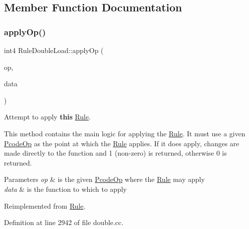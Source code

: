 \subsection{Member Function Documentation}
\mbox{\label{class_rule_double_load_afbb821bf5ea445001a47351ec57bbeb1}} 
\subsubsection{\texorpdfstring{applyOp()}{applyOp()}}
{\footnotesize\ttfamily int4 Rule\+Double\+Load\+::apply\+Op (\begin{DoxyParamCaption}\item[{\mbox{\hyperlink{class_pcode_op}{Pcode\+Op}} $\ast$}]{op,  }\item[{\mbox{\hyperlink{class_funcdata}{Funcdata}} \&}]{data }\end{DoxyParamCaption})\hspace{0.3cm}{\ttfamily [virtual]}}



Attempt to apply {\bfseries{this}} \mbox{\hyperlink{class_rule}{Rule}}. 

This method contains the main logic for applying the \mbox{\hyperlink{class_rule}{Rule}}. It must use a given \mbox{\hyperlink{class_pcode_op}{Pcode\+Op}} as the point at which the \mbox{\hyperlink{class_rule}{Rule}} applies. If it does apply, changes are made directly to the function and 1 (non-\/zero) is returned, otherwise 0 is returned. 
\begin{DoxyParams}{Parameters}
{\em op} & is the given \mbox{\hyperlink{class_pcode_op}{Pcode\+Op}} where the \mbox{\hyperlink{class_rule}{Rule}} may apply \\
\hline
{\em data} & is the function to which to apply \\
\hline
\end{DoxyParams}


Reimplemented from \mbox{\hyperlink{class_rule_a4e3e61f066670175009f60fb9dc60848}{Rule}}.



Definition at line 2942 of file double.\+cc.

